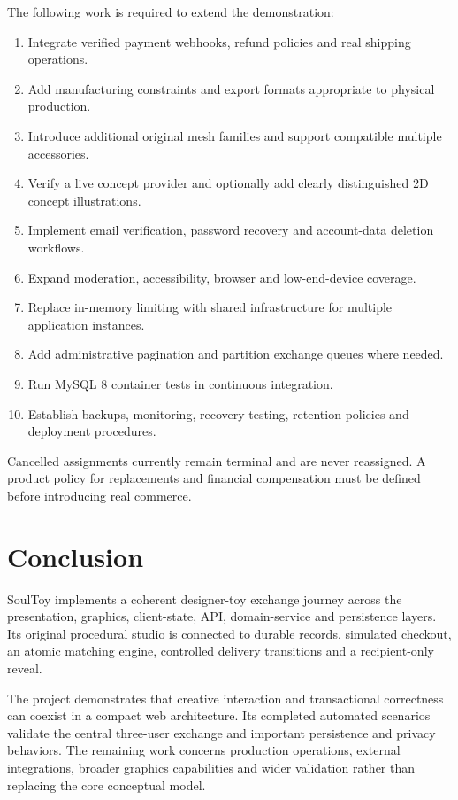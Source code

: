 \documentclass[11pt,a4paper]{article}
\begin{document}
The following work is required to extend the demonstration:
\begin{enumerate}
  \item Integrate verified payment webhooks, refund policies and real shipping operations.
  \item Add manufacturing constraints and export formats appropriate to physical production.
  \item Introduce additional original mesh families and support compatible multiple accessories.
  \item Verify a live concept provider and optionally add clearly distinguished 2D concept illustrations.
  \item Implement email verification, password recovery and account-data deletion workflows.
  \item Expand moderation, accessibility, browser and low-end-device coverage.
  \item Replace in-memory limiting with shared infrastructure for multiple application instances.
  \item Add administrative pagination and partition exchange queues where needed.
  \item Run MySQL 8 container tests in continuous integration.
  \item Establish backups, monitoring, recovery testing, retention policies and deployment procedures.
\end{enumerate}

Cancelled assignments currently remain terminal and are never reassigned. A product policy for replacements and financial compensation must be defined before introducing real commerce.

\section{Conclusion}

SoulToy implements a coherent designer-toy exchange journey across the presentation, graphics, client-state, API, domain-service and persistence layers. Its original procedural studio is connected to durable records, simulated checkout, an atomic matching engine, controlled delivery transitions and a recipient-only reveal.

The project demonstrates that creative interaction and transactional correctness can coexist in a compact web architecture. Its completed automated scenarios validate the central three-user exchange and important persistence and privacy behaviors. The remaining work concerns production operations, external integrations, broader graphics capabilities and wider validation rather than replacing the core conceptual model.
\end{document}

